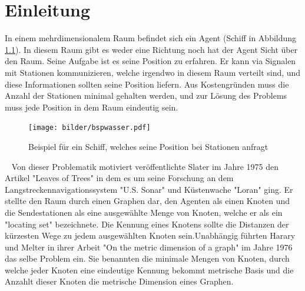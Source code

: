





\chapter{Einleitung}
\vspace{-2mm}
In einem mehrdimensionalem Raum befindet sich ein Agent (Schiff in Abbildung \ref{schiff}). In diesem Raum gibt es weder eine Richtung noch hat der Agent Sicht über den Raum. Seine Aufgabe ist es seine Position zu erfahren. Er kann via Signalen mit Stationen kommunizieren, welche irgendwo in diesem Raum verteilt sind, und diese Informationen sollten seine Position liefern. Aus Kostengründen muss die Anzahl der Stationen minimal gehalten werden, und zur Lösung des Problems muss jede Position in dem Raum eindeutig sein.\newline\newline 
\vspace{-14mm}
\newline
\begin{figure}[h]
\centering
\texttt{[image: bilder/bspwasser.pdf]}
\caption{Beispiel für ein Schiff, welches seine Position bei Stationen anfragt}
\label{schiff}
\end{figure}
\vspace{-3mm}
~\linebreak
Von dieser Problematik motiviert veröffentlichte Slater im Jahre 1975 den Artikel "Leaves of Trees"\cite{slater} in dem es um seine Forschung an dem Langstreckennavigationssystem "U.S. Sonar" und Küstenwache "Loran" ging. Er stellte den Raum durch einen Graphen dar, den Agenten als einen Knoten und die Sendestationen als eine ausgewählte Menge von Knoten, welche er als ein "locating set" bezeichnete. Die Kennung eines Knotens sollte  die Distanzen der kürzesten Wege zu jedem ausgewählten Knoten sein.\vspace{-1mm}\newline\newline Unabhängig führten Harary und Melter in ihrer Arbeit "On the metric dimension of a graph"\cite{harary} im Jahre 1976 das selbe Problem ein. Sie benannten die minimale Mengen von Knoten, durch welche jeder Knoten eine eindeutige Kennung bekommt metrische Basis und die Anzahlt dieser Knoten die metrische Dimension eines Graphen.\vspace{-1mm}\newline\newline

